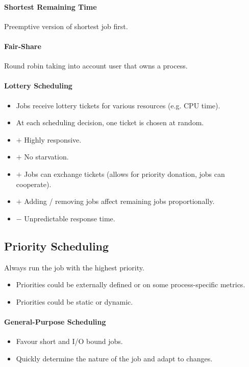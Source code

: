\documentclass[twocolumn,english]{article}
\begin{document}
\paragraph{Shortest Remaining Time}

Preemptive version of shortest job first.

\paragraph{Fair-Share}

Round robin taking into account user that owns a process.

\paragraph{Lottery Scheduling}
\begin{itemize}
\item Jobs receive lottery tickets for various resources (e.g. CPU time).
\item At each scheduling decision, one ticket is chosen at random.
\item $+$ Highly responsive.
\item $+$ No starvation.
\item $+$ Jobs can exchange tickets (allows for priority donation, jobs
can cooperate).
\item $+$ Adding / removing jobs affect remaining jobs proportionally.
\item $-$ Unpredictable response time.
\end{itemize}

\subsection{Priority Scheduling}

Always run the job with the highest priority.
\begin{itemize}
\item Priorities could be externally defined or on some process-specific
metrics.
\item Priorities could be static or dynamic.
\end{itemize}

\paragraph{General-Purpose Scheduling}
\begin{itemize}
\item Favour short and I/O bound jobs.
\item Quickly determine the nature of the job and adapt to changes.
\end{itemize}
\end{document}

